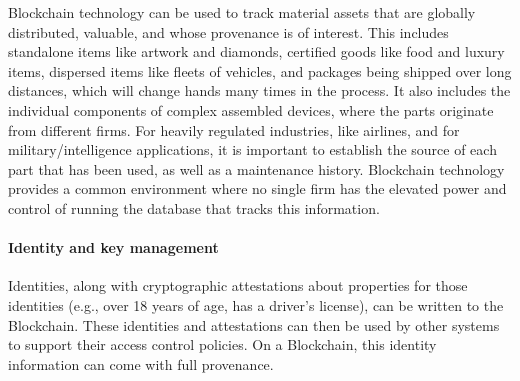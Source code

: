 Blockchain technology can be used to track material assets that are globally 
distributed, valuable, and whose provenance is of interest.
This includes standalone items like artwork and diamonds, certified goods like food and luxury items, dispersed items like fleets of vehicles, and packages being shipped over long distances, which will change hands many times in the process. 
It also includes the individual components of complex assembled devices, where the parts originate from different firms. 
For heavily regulated industries, like airlines, and for military/intelligence applications, it is important to establish the source of each part that has been used, as well as a maintenance history.
%
Blockchain technology provides a common environment where no single firm has the elevated power and control of running the database that tracks this information.

\paragraph{Identity and key management}

Identities, along with cryptographic attestations about properties for those identities (e.g., over 18 years of age, has a driver's license), can be written to the Blockchain.
These identities and attestations can then be used by other systems to support their access control policies.
On a Blockchain, this identity information can come with full provenance.

